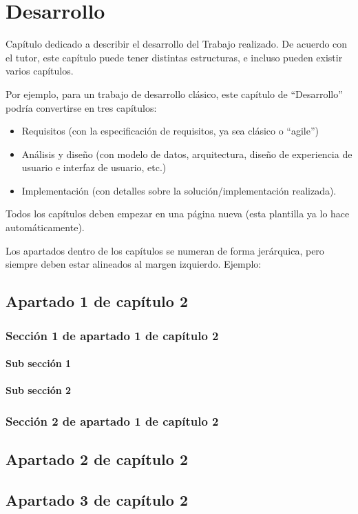 \chapter{Desarrollo}
Capítulo dedicado a describir el desarrollo del Trabajo realizado. De acuerdo con el tutor, este capítulo puede tener distintas estructuras, e incluso pueden existir varios capítulos.

Por ejemplo, para un trabajo de desarrollo clásico, este capítulo de ``Desarrollo'' podría convertirse en tres capítulos:

\begin{itemize}
\item Requisitos (con la especificación de requisitos, ya sea clásico o ``agile'')
\item Análisis y diseño (con  modelo de datos, arquitectura, diseño de experiencia de usuario e interfaz de usuario, etc.)
\item Implementación (con detalles sobre la solución/implementación realizada).
\end{itemize}

Todos los capítulos deben empezar en una página nueva (esta plantilla ya lo hace automáticamente).

Los apartados dentro de los capítulos se numeran de forma jerárquica, pero siempre deben estar alineados al margen izquierdo. Ejemplo:

\section{Apartado 1 de capítulo 2}

\subsection{Sección 1 de apartado 1 de capítulo 2}

\subsubsection{Sub sección 1}

\subsubsection{Sub sección 2}

\subsection{Sección 2 de apartado 1 de capítulo 2}

\section{Apartado 2 de capítulo 2}

\section{Apartado 3 de capítulo 2}
